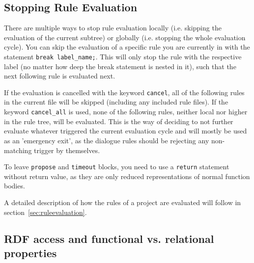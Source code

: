 \subsection{Stopping Rule Evaluation}
\label{sec:cancelrules}
There are multiple ways to stop rule evaluation locally (i.e. skipping the
evaluation of the current subtree) or globally (i.e. stopping the whole
evaluation cycle).
You can skip the evaluation of a specific rule you are currently in with the
statement \texttt{break label\_name;}. This will only stop the rule with the
respective label (no matter how deep the break statement is nested in it), such
that the next following rule is evaluated next.

If the evaluation is cancelled with the keyword \texttt{cancel}, all of the
following rules in the current file will be skipped (including any included
rule files). If the keyword \texttt{cancel\_all} is used, none of the following
rules, neither local nor higher in the rule tree, will be evaluated. This is
the \vonda way of deciding to not further evaluate whatever triggered the
current evaluation cycle and will mostly be used as an 'emergency exit', as the
dialogue rules should be rejecting any non-matching trigger by themselves.

To leave \texttt{propose} and \texttt{timeout} blocks, you need to use a
\texttt{return} statement without return value, as they are only reduced
representations of normal function bodies.

A detailed description of how the rules of a \vonda project are evaluated will
follow in section~\ref{sec:ruleevaluation}.


\subsection{RDF access and functional vs. relational properties}
\label{sec:rdfaccesses}

